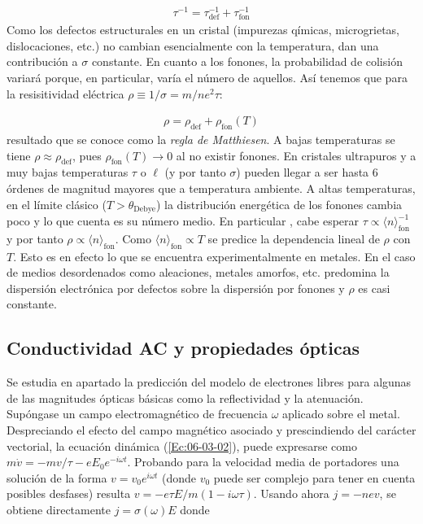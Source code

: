 \begin{eqnarray}
	\tau^{-1} = \tau_{\text{def}}^{-1} +\tau_{\text{fon}}^{-1}
	\label{Ec:06-03-04}
\end{eqnarray}
Como los defectos estructurales en un cristal (impurezas qímicas, microgrietas, dislocaciones, etc.) no cambian esencialmente con la temperatura, dan una contribución a $\sigma$ constante. En cuanto a los fonones, la probabilidad de colisión variará porque, en particular, varía el número de aquellos. Así tenemos que para la resisitividad eléctrica $\rho\equiv 1/\sigma=m/ne^2 \tau$:

\begin{eqnarray}
	\rho = \rho_{\text{def}} + \rho_{\text{fon}} (T)
\end{eqnarray}
resultado que se conoce como la \textit{regla de Matthiesen}. A bajas temperaturas se tiene $\rho\approx \rho_{\text{def}}$, pues $\rho_{\text{fon}}(T)\rightarrow0$ al no existir fonones. En cristales ultrapuros y a muy bajas temperaturas $\tau$ o $\ell$ (y por tanto $\sigma$) pueden llegar a ser hasta 6 órdenes de magnitud mayores que a temperatura ambiente. A altas temperaturas, en el límite clásico ($T>\theta_{\text{Debye}}$) la distribución energética de los fonones cambia poco y lo que cuenta es su número medio. En particular , cabe esperar $\tau \propto \langle n \rangle_{\text{fon}}^{-1}$ y por tanto $\rho \propto \langle n \rangle_\text{fon}$. Como $\langle n \rangle_\text{fon} \propto T$ se predice la dependencia lineal de $\rho$ con $T$. Esto es en efecto lo que se encuentra experimentalmente en metales. En el caso de medios desordenados como aleaciones, metales amorfos, etc. predomina la dispersión electrónica por defectos sobre la dispersión por fonones y $\rho$ es casi constante.
\subsection{Conductividad AC y propiedades ópticas}

Se estudia en apartado la predicción del modelo de electrones libres para algunas de las magnitudes ópticas básicas como la reflectividad y la atenuación. Supóngase un campo electromagnético de frecuencia $\omega$ aplicado sobre el metal. Despreciando el efecto del campo magnético asociado y prescindiendo del carácter vectorial, la ecuación dinámica (\ref{Ec:06-03-02}), puede expresarse como $m\dot{v}=-mv/\tau-eE_0e^{-i\omega t}$. Probando para la velocidad media de portadores una solución de la forma $v=v_0 e^{i\omega t}$ (donde $v_0$ puede ser complejo para tener en cuenta posibles desfases) resulta $v=-e\tau E / m(1-i\omega\tau)$. Usando ahora $j=-nev$, se obtiene directamente $j=\sigma(\omega)E$ donde 

